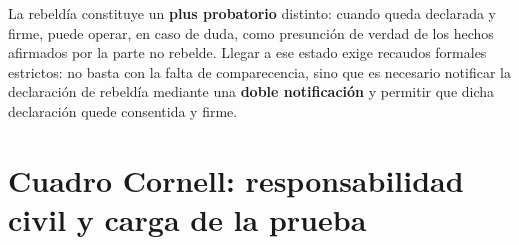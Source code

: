 \documentclass[12pt,oneside]{book}
\begin{document}
La rebeldía constituye un \textbf{plus probatorio} distinto: cuando queda declarada y firme, puede operar, en caso de duda, como presunción de verdad de los hechos afirmados por la parte no rebelde. Llegar a ese estado exige recaudos formales estrictos: no basta con la falta de comparecencia, sino que es necesario notificar la declaración de rebeldía mediante una \textbf{doble notificación} y permitir que dicha declaración quede consentida y firme.

\section*{Cuadro Cornell: responsabilidad civil y carga de la prueba}
\end{document}
